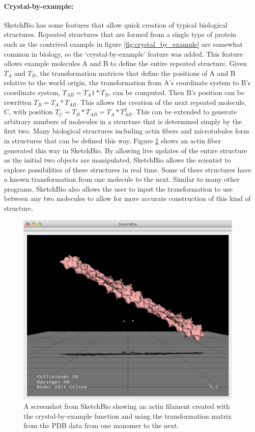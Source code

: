 \documentclass[twocolumn]{bmcart}%
\begin{document}
\paragraph*{Crystal-by-example:}
SketchBio has some features that allow quick creation of typical biological structures.  Repeated structures that are formed from a single type of protein such as the contrived example in figure \ref{fig:crystal_by_example} are somewhat common in biology, so the ‘crystal-by-example' feature was added.  This feature allows example molecules A and B to define the entire repeated structure.  Given $T_A$ and $T_B$, the transformation matrices that define the positions of A and B relative to the world origin, the transformation from A's coordinate system to B's coordinate system, $T_{AB} = T_A^-1*T_B$, can be computed.  Then B's position can be rewritten $T_B = T_A*T_{AB}$.  This allows the creation of the next repeated molecule, C, with position $T_C = T_B*T_{AB} = T_A*T_{AB}^2$.  This can be extended to generate arbitrary numbers of molecules in a structure that is determined simply by the first two.  Many biological structures including actin fibers and microtubules form in structures that can be defined this way.  Figure \ref{fig:crystal_actin} shows an actin fiber generated this way in SketchBio.  By allowing live updates of the entire structure as the initial two objects are manipulated, SketchBio allows the scientist to explore possibilities of these structures in real time.  Some of these structures have a known transformation from one molecule to the next.  Similar to many other programs, SketchBio also allows the user to input the transformation to use between any two molecules to allow for more accurate construction of this kind of structure.

\begin{figure}[h]
\centering
\includegraphics[width=0.8\columnwidth]{crystal_actin.png}
\caption{A screenshot from SketchBio showing an actin filament created with the crystal-by-example function and using the transformation matrix from the PDB data from one monomer to the next.}
\label{fig:crystal_actin}
\end{figure}
\end{document}
